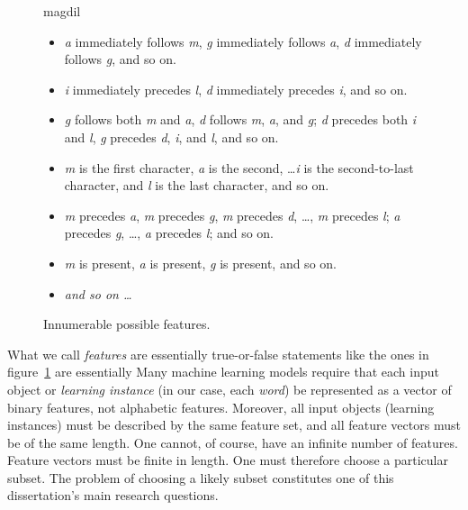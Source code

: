 \begin{figure}[ht]
\caption{Innumerable possible features.}
\label{fig:many-feats}
\begin{center}
\Large{magdil}
\end{center}
\begin{itemize}
  \item \textit{a} immediately follows \textit{m}, \textit{g} immediately follows \textit{a}, \textit{d} immediately follows \textit{g}, and so on. 
  \item \textit{i} immediately precedes \textit{l}, \textit{d} immediately precedes \textit{i}, and so on. %
   \item \textit{g} follows both \textit{m} and \textit{a}, \textit{d} follows \textit{m}, \textit{a}, and \textit{g}; \textit{d} precedes both \textit{i} and \textit{l}, \textit{g} precedes \textit{d}, \textit{i}, and \textit{l}, and so on.
   \item \textit{m} is the first character, \textit{a} is the second, \dots \textit{i} is the second-to-last character, and \textit{l} is the last character, and so on.
   \item \textit{m} precedes \textit{a}, \textit{m} precedes \textit{g}, \textit{m} precedes \textit{d}, \dots, \textit{m} precedes \textit{l}; \textit{a} precedes \textit{g}, \dots , \textit{a} precedes \textit{l}; and so on.
   \item \textit{m} is present, \textit{a} is present, \textit{g} is present, and so on.
   \item \emph{and so on \dots}
\end{itemize}
\end{figure}

What we call \emph{features} are essentially true-or-false statements like the ones in figure~\ref{fig:many-feats} are essentially 
Many machine learning models require that each input object or \emph{learning instance} 
(in our case, each \emph{word}) be represented as a vector of binary features, not alphabetic 
features. Moreover, all input objects (learning instances) must be described by the same feature 
set, and all feature vectors must be of the same length.
One cannot, of course, have an infinite number of features. Feature vectors must be finite in length.
One must therefore choose a particular subset. The problem of choosing a likely subset constitutes one of
this dissertation's main research questions. 

